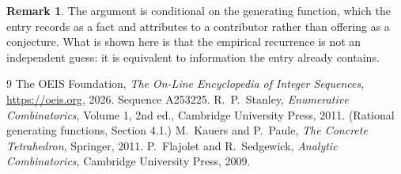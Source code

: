 \documentclass[11pt,a4paper]{article}
\theoremstyle{plain}
\theoremstyle{definition}
\newtheorem{remark}[theorem]{Remark}
\begin{document}
\begin{remark}
The argument is conditional on the generating function, which the entry records as a fact and
attributes to a contributor rather than offering as a conjecture. What is shown here is that
the empirical recurrence is not an independent guess: it is equivalent to information the
entry already contains.
\end{remark}

\begin{thebibliography}{9}
 The OEIS Foundation, \emph{The On-Line Encyclopedia of Integer
Sequences}, \url{https://oeis.org}, 2026. Sequence A253225.
 R.~P.~Stanley, \emph{Enumerative Combinatorics}, Volume 1, 2nd ed.,
Cambridge University Press, 2011. (Rational generating functions, Section 4.1.)
 M.~Kauers and P.~Paule, \emph{The Concrete Tetrahedron}, Springer, 2011.
 P.~Flajolet and R.~Sedgewick, \emph{Analytic Combinatorics}, Cambridge
University Press, 2009.
\end{thebibliography}
\end{document}
